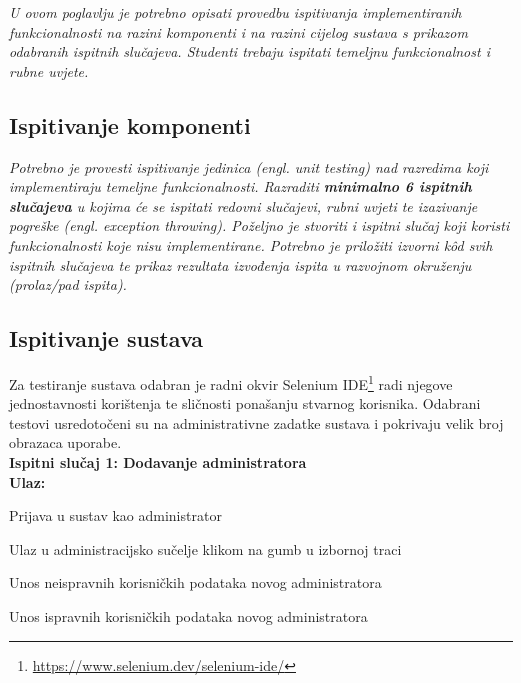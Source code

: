 			 \textit{U ovom poglavlju je potrebno opisati provedbu ispitivanja implementiranih funkcionalnosti na razini komponenti i na razini cijelog sustava s prikazom odabranih ispitnih slučajeva. Studenti trebaju ispitati temeljnu funkcionalnost i rubne uvjete.}
	
			
			\subsection{Ispitivanje komponenti}
			\textit{Potrebno je provesti ispitivanje jedinica (engl. unit testing) nad razredima koji implementiraju temeljne funkcionalnosti. Razraditi \textbf{minimalno 6 ispitnih slučajeva} u kojima će se ispitati redovni slučajevi, rubni uvjeti te izazivanje pogreške (engl. exception throwing). Poželjno je stvoriti i ispitni slučaj koji koristi funkcionalnosti koje nisu implementirane. Potrebno je priložiti izvorni kôd svih ispitnih slučajeva te prikaz rezultata izvođenja ispita u razvojnom okruženju (prolaz/pad ispita). }
			
			
			
			\subsection{Ispitivanje sustava}
			
			Za testiranje sustava odabran je radni okvir Selenium IDE\footnote{\url{https://www.selenium.dev/selenium-ide/}} radi njegove jednostavnosti korištenja te sličnosti ponašanju stvarnog korisnika. Odabrani testovi usredotočeni su na administrativne zadatke sustava i pokrivaju velik broj obrazaca uporabe.\\ 
			 
			 \textbf{Ispitni slučaj 1: Dodavanje administratora}\\
			 \textbf{Ulaz:}
			 \begin{packed_item}
			 	\item {Prijava u sustav kao administrator}
			 	\item {Ulaz u administracijsko sučelje klikom na gumb u izbornoj traci}
			 	\item {Unos neispravnih korisničkih podataka novog administratora}
			 	\item {Unos ispravnih korisničkih podataka novog administratora}
			 \end{packed_item}
			 
